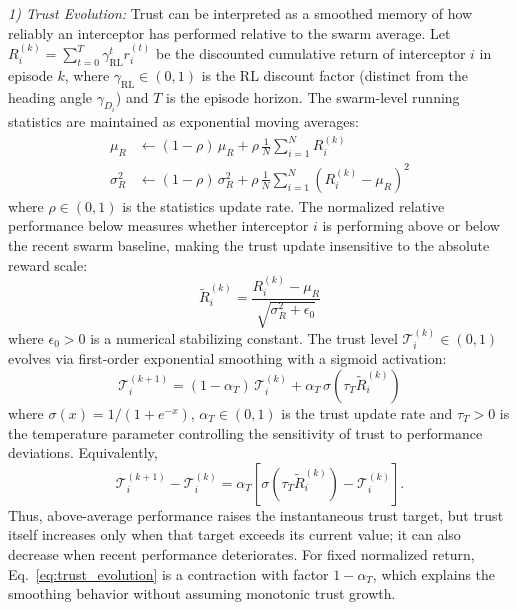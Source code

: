 \documentclass[lettersize,journal]{IEEEtran}
\begin{document}
\emph{1) Trust Evolution:} Trust can be interpreted as a smoothed memory of how reliably an interceptor has performed relative to the swarm average. Let $R_i^{(k)} = \sum_{t=0}^{T} \gamma_{\mathrm{RL}}^t r_i^{(t)}$ be the discounted cumulative return of interceptor $i$ in episode $k$, where $\gamma_{\mathrm{RL}} \in (0,1)$ is the RL discount factor (distinct from the heading angle $\gamma_{D_i}$) and $T$ is the episode horizon. The swarm-level running statistics are maintained as exponential moving averages:
\begin{align}
\mu_R &\leftarrow (1-\rho)\,\mu_R + \rho\,\frac{1}{N}\sum_{i=1}^{N} R_i^{(k)} \label{eq:running_stats_mu} \\
\sigma_R^2 &\leftarrow (1-\rho)\,\sigma_R^2 + \rho\,\frac{1}{N}\sum_{i=1}^{N}\!\left(R_i^{(k)} - \mu_R\right)^2 \label{eq:running_stats_sigma}
\end{align}
where $\rho \in (0,1)$ is the statistics update rate. The normalized relative performance below measures whether interceptor $i$ is performing above or below the recent swarm baseline, making the trust update insensitive to the absolute reward scale:
\begin{equation}
\label{eq:trust_normalized}
\tilde{R}_i^{(k)} = \frac{R_i^{(k)} - \mu_R}{\sqrt{\sigma_R^2 + \epsilon_0}}
\end{equation}
where $\epsilon_0 > 0$ is a numerical stabilizing constant. The trust level $\mathcal{T}_i^{(k)} \in (0,1)$ evolves via first-order exponential smoothing with a sigmoid activation:
\begin{equation}
\label{eq:trust_evolution}
\mathcal{T}_i^{(k+1)} = (1-\alpha_T)\,\mathcal{T}_i^{(k)} + \alpha_T\,\sigma\!\left(\tau_T \tilde{R}_i^{(k)}\right)
\end{equation}
where $\sigma(x) = 1/(1+e^{-x})$, $\alpha_T \in (0,1)$ is the trust update rate and $\tau_T > 0$ is the temperature parameter controlling the sensitivity of trust to performance deviations. Equivalently,
\begin{equation}
\label{eq:trust_increment}
\mathcal T_i^{(k+1)}-\mathcal T_i^{(k)}
=\alpha_T\!\left[
\sigma(\tau_T\widetilde R_i^{(k)})-\mathcal T_i^{(k)}\right].
\end{equation}
Thus, above-average performance raises the instantaneous trust target, but
trust itself increases only when that target exceeds its current value; it can
also decrease when recent performance deteriorates. For fixed normalized
return, Eq.~\eqref{eq:trust_evolution} is a contraction with factor
\(1-\alpha_T\), which explains the smoothing behavior without assuming
monotonic trust growth.
\end{document}
